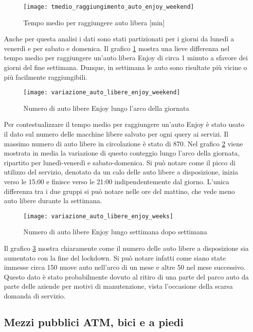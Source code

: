 \begin{figure}[H]
	\texttt{[image: tmedio\_raggiungimento\_auto\_enjoy\_weekend]}
	\caption{Tempo medio per raggiungere auto libera [min]}
	\label{image:21}
\end{figure}

Anche per questa analisi i dati sono stati partizionati per i giorni da lunedì a venerdì e per sabato e domenica. Il grafico \ref{image:21} mostra una lieve differenza nel tempo medio per raggiungere un'auto libera Enjoy di circa 1 minuto a sfavore dei giorni del fine settimana. Dunque, in settimana le auto sono risultate più vicine o più facilmente raggiungibili.

\begin{figure}[H]
\texttt{[image: variazione\_auto\_libere\_enjoy\_weekend]}
\caption{Numero di auto libere Enjoy lungo l'arco della giornata}
\label{image:9}
\end{figure}

Per contestualizzare il tempo medio per raggiungere un'auto Enjoy è stato usato il dato sul numero delle macchine libere salvato per ogni query ai servizi. Il massimo numero di auto libere in circolazione è stato di 870. Nel grafico \ref{image:9} viene mostrata in media la variazione di questo conteggio lungo l'arco della giornata, ripartito per lunedì-venerdì e sabato-domenica. Si può notare come il picco di utilizzo del servizio, denotato da un calo delle auto libere a disposizione, inizia verso le 15:00 e finisce verso le 21:00 indipendentemente dal giorno. L'unica differenza tra i due gruppi si può notare nelle ore del mattino, che vede meno auto libere durante la settimana.

\begin{figure}[H]
\texttt{[image: variazione\_auto\_libere\_enjoy\_weeks]}
\caption{Numero di auto libere Enjoy lungo settimana dopo settimana}
\label{image:10}
\end{figure}

Il grafico \ref{image:10} mostra chiaramente come il numero delle auto libere a disposizione sia aumentato con la fine del lockdown. Si può notare infatti come siano state immesse circa 150 nuove auto nell'arco di un mese e altre 50 nel mese successivo. Questo dato è stato probabilmente dovuto al ritiro di una parte del parco auto da parte delle aziende per motivi di manutenzione, vista l'occasione della scarsa domanda di servizio.

\subsection{Mezzi pubblici ATM, bici e a piedi}

